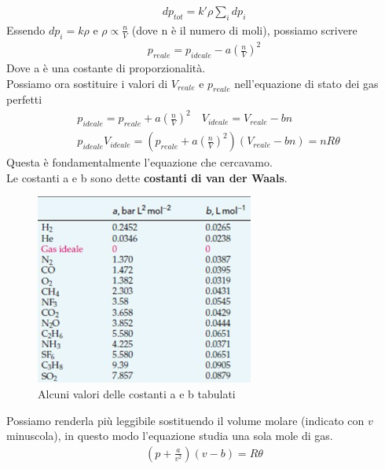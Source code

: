 \documentclass[10pt,a4paper]{article}
\begin{document}
\begin{align*} 
	dp_{tot} = k' \rho \sum_i dp_i 
\end{align*} 
Essendo $dp_i = k \rho$ e $\rho \propto \frac{n}{V}$ (dove n è il numero di moli), possiamo scrivere
\begin{align*} 
p_{reale} = p_{ideale}- a  \left(\frac{n}{V}\right)^2
\end{align*} 
Dove a è una costante di proporzionalità.\\
Possiamo ora sostituire i valori di $V_{reale}$ e $p_{reale}$ nell'equazione di stato dei gas perfetti
\begin{align*} 
	& p_{ideale} = p_{reale} + a \left(\frac{n}{V}\right)^2 \quad V_{ideale} = V_{reale} - b n\\
	& p_{ideale} V_{ideale} = \left(p_{reale} + a \left(\frac{n}{V}\right)^2 \right) \left( V_{reale} - b n \right) = n R \theta 
\end{align*} 
Questa è fondamentalmente l'equazione che cercavamo.\\
Le costanti a e b sono dette \textbf{costanti di van der Waals}.
\begin{figure}[h!]
	\centering
	\includegraphics[width=0.5\linewidth]{../images/costantiaeb}
	\caption{Alcuni valori delle costanti a e b tabulati}
	\label{fig:costantiaeb}
\end{figure}
\FloatBarrier
Possiamo renderla più leggibile sostituendo il volume molare (indicato con $v$ minuscola), in questo modo l'equazione studia una sola mole di gas.  
\begin{align*} 
\left( p + \frac{a}{v^2}\right)\left(v-b\right) = R \theta
\end{align*} 
\end{document}
